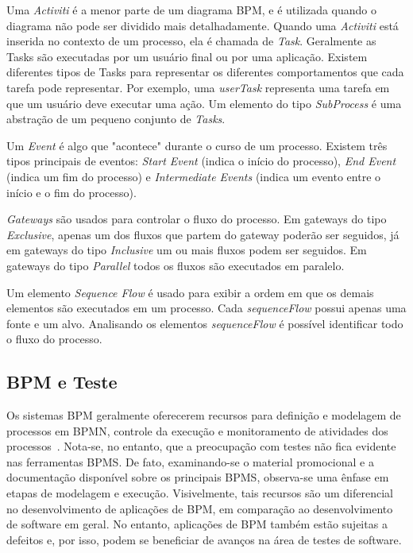 \documentclass[12pt]{article}
\begin{document}
Uma \emph{Activiti} é a menor parte de um diagrama BPM, e é utilizada quando o diagrama não pode ser dividido mais detalhadamente. Quando uma \emph{Activiti} está inserida no contexto de um processo, ela é chamada de \emph{Task}. Geralmente as Tasks são executadas por um usuário final ou por uma aplicação. Existem diferentes tipos de Tasks para representar os diferentes comportamentos que cada tarefa pode representar. Por exemplo, uma \emph{userTask} representa uma tarefa em que um usuário deve executar uma ação. Um elemento do tipo \emph{SubProcess} é uma abstração de um pequeno conjunto de \emph{Tasks}.

Um \emph{Event} é algo que "acontece" durante o curso de um processo\cite{model2011notation}. Existem três tipos principais de eventos: \emph{Start Event} (indica o início do processo), \emph{End Event} (indica um fim do processo) e \emph{Intermediate Events} (indica um evento entre o início e o fim do processo).

\emph{Gateways} são usados para controlar o fluxo do processo. Em gateways do tipo \emph{Exclusive}, apenas um dos fluxos que partem do gateway poderão ser seguidos, já em gateways do tipo \emph{Inclusive} um ou mais fluxos podem ser seguidos. Em gateways do tipo \emph{Parallel} todos os fluxos são executados em paralelo.


Um elemento \emph{Sequence Flow} é usado para exibir a ordem em que os demais elementos são executados em um processo. Cada \emph{sequenceFlow} possui apenas uma fonte e um alvo. Analisando os elementos \emph{sequenceFlow} é possível identificar todo o fluxo do processo.

\subsection{BPM e Teste}

Os sistemas BPM geralmente oferecerem recursos para definição e modelagem de processos em BPMN, controle da execução e monitoramento de atividades dos processos~\cite{forrester}. Nota-se, no entanto, que a preocupação com testes não fica evidente nas ferramentas BPMS. De fato, examinando-se o material promocional e a documentação disponível sobre os principais BPMS, observa-se uma ênfase em etapas de modelagem e execução. Visivelmente, tais recursos são um diferencial no desenvolvimento de aplicações de BPM, em comparação ao desenvolvimento de software em geral. No entanto, aplicações de BPM também estão sujeitas a defeitos e, por isso, podem se beneficiar de avanços na área de testes de software.
\end{document}
